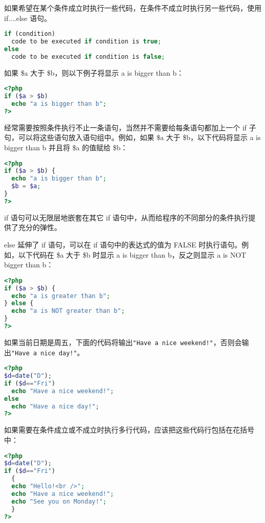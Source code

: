 如果希望在某个条件成立时执行一些代码，在条件不成立时执行另一些代码，使用 if....else 语句。

\begin{lstlisting}[language=PHP]
if (condition)
  code to be executed if condition is true;
else
  code to be executed if condition is false; 
\end{lstlisting}


如果 \$a 大于 \$b，则以下例子将显示 a is bigger than b：

\begin{lstlisting}[language=PHP]
<?php
if ($a > $b)
  echo "a is bigger than b";
?>
\end{lstlisting}

经常需要按照条件执行不止一条语句，当然并不需要给每条语句都加上一个 if 子句，可以将这些语句放入语句组中。例如，如果 \$a 大于 \$b，以下代码将显示 a is bigger than b 并且将 \$a 的值赋给 \$b：

\begin{lstlisting}[language=PHP]
<?php
if ($a > $b) {
  echo "a is bigger than b";
  $b = $a;
}
?>
\end{lstlisting}

if 语句可以无限层地嵌套在其它 if 语句中，从而给程序的不同部分的条件执行提供了充分的弹性。

else 延伸了 if 语句，可以在 if 语句中的表达式的值为 FALSE 时执行语句。例如，以下代码在 \$a 大于 \$b 时显示 a is bigger than b，反之则显示 a is NOT bigger than b：


\begin{lstlisting}[language=PHP]
<?php
if ($a > $b) {
  echo "a is greater than b";
} else {
  echo "a is NOT greater than b";
}
?>
\end{lstlisting}

如果当前日期是周五，下面的代码将输出\texttt{"Have a nice weekend!"}，否则会输出\texttt{"Have a nice day!"}。


\begin{lstlisting}[language=PHP]
<?php
$d=date("D");
if ($d=="Fri")
  echo "Have a nice weekend!"; 
else
  echo "Have a nice day!"; 
?>
\end{lstlisting}

如果需要在条件成立或不成立时执行多行代码，应该把这些代码行包括在花括号中：

\begin{lstlisting}[language=PHP]
<?php
$d=date("D");
if ($d=="Fri")
  {
  echo "Hello!<br />"; 
  echo "Have a nice weekend!";
  echo "See you on Monday!";
  }
?>
\end{lstlisting}

